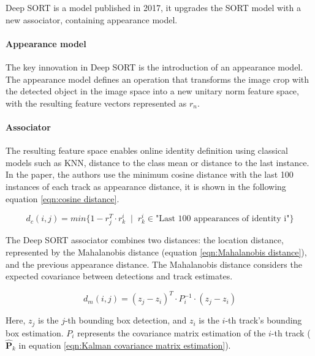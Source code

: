 
{
    Deep SORT\cite{Wojke2017simple} is a model published in 2017, it upgrades the SORT model with a new associator, containing appearance model.
}

\paragraph{Appearance model}

{
    The key innovation in Deep SORT is the introduction of an appearance model.
    The appearance model defines an operation that transforms the image crop with 
    the detected object in the image space into a new unitary norm feature space, 
    with the resulting feature vectors represented as $r_n$.
}


\paragraph{Associator}

{
    The resulting feature space enables online identity definition using classical models such as \ac{KNN}, distance to the class mean or distance to the last instance.
    In the paper, the authors use the minimum cosine distance with the last 100 instances of each track as appearance distance, it is shown in the following equation \ref{eqn:cosine distance}.
}

\begin{equation}
    \label{eqn:cosine distance}
    d_{c}(i, j) = min\{1 - r_{j}^T \cdot r_{k}^{i} \;\mid\; r_{k}^{i} \in \text{"Last 100 appearances of identity i"} \}
\end{equation}

{
    The Deep SORT associator combines two distances: the location distance, represented by the Mahalanobis distance (equation \ref{eqn:Mahalanobis distance}), and the previous appearance distance. 
    The Mahalanobis distance considers the expected covariance between detections and track estimates. 
}

\begin{equation}
    \label{eqn:Mahalanobis distance}
    d_{m}(i, j) = (z_{j} - z_{i})^T \cdot P_{i}^{-1} \cdot (z_{j} - z_{i})
\end{equation}

{
    Here, $z_j$ is the $j$-th bounding box detection, and $z_i$ is the $i$-th track's bounding box estimation. 
    $P_i$ represents the covariance matrix estimation of the $i$-th track ($\hat{\mathbf{P}}_{k}$ in equation \ref{eqn:Kalman covariance matrix estimation}).
}

